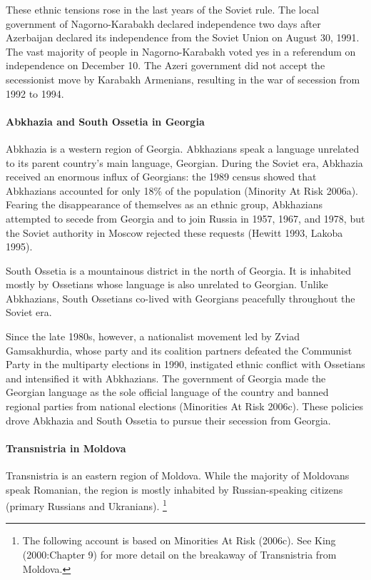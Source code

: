 \documentclass[12pt,a4paper]{article}%
\begin{document}
These ethnic tensions rose in the last years of the Soviet rule. 
The local government of Nagorno-Karabakh declared independence two days after Azerbaijan declared its independence from the Soviet Union on August 30, 1991. 
The vast majority of people in Nagorno-Karabakh voted yes in a referendum on independence on December 10. 
The Azeri government did not accept the secessionist move by Karabakh Armenians, resulting in the war of secession from 1992 to 1994.

\paragraph{Abkhazia and South Ossetia in Georgia}
Abkhazia is a western region of Georgia. Abkhazians speak a language unrelated to its parent country's main language, Georgian. 
During the Soviet era, Abkhazia received an enormous influx of Georgians: the 1989 census showed that Abkhazians accounted for only 18\% of the population (Minority At Risk 2006a).
Fearing the disappearance of themselves as an ethnic group, Abkhazians attempted to secede from Georgia and to join Russia in 1957, 1967, and 1978, but the Soviet authority in Moscow rejected these requests (Hewitt 1993, Lakoba 1995).

South Ossetia is a mountainous district in the north of Georgia. 
It is inhabited mostly by Ossetians whose language is also unrelated to Georgian. 
Unlike Abkhazians, South Ossetians co-lived with Georgians peacefully throughout the Soviet era.

Since the late 1980s, however, a nationalist movement led by Zviad Gamsakhurdia, whose party and its coalition partners defeated the Communist Party in the multiparty elections in 1990, instigated ethnic conflict with Ossetians and intensified it with Abkhazians.
The government of Georgia made the Georgian language as the sole official language of the country and banned regional parties from national elections (Minorities At Risk 2006c).
These policies drove Abkhazia and South Ossetia to pursue their secession from Georgia.

\paragraph{Transnistria in Moldova}
Transnistria is an eastern region of Moldova. While the majority of Moldovans speak Romanian, the region is mostly inhabited by Russian-speaking citizens (primary Russians and Ukranians).%
\footnote{
	The following account is based on Minorities At Risk (2006c). See King (2000:Chapter 9) for more detail on the breakaway of Transnistria from Moldova.
} 
\end{document}
